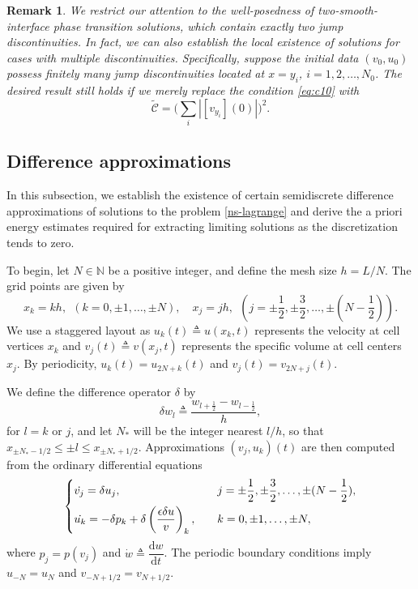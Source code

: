 \documentclass[a4paper,oneside,11pt]{article}
\numberwithin{equation}{section}
\newtheorem{remark}{Remark}[section]
\begin{document}
\begin{remark}
We restrict our attention to the well-posedness of two-smooth-interface phase transition solutions, which contain exactly two jump discontinuities. In fact, we can also establish the local existence of solutions for cases with multiple discontinuities. Specifically, suppose the initial data $(v_0, u_0)$ possess finitely many jump discontinuities located at $x=y_i$, $i=1,2,\dots,N_0$. The desired result still holds if we merely replace the condition \eqref{eq:c10} with 
\begin{equation*}
\widetilde{\mathscr{C}}=\big(\mathop{\sum }\limits_{i}|[v_{y_i}](0)|\big)^{2}.
\end{equation*}
\end{remark}


\subsection{Difference approximations}
\indent\qquad
In this subsection, we establish the existence of certain semidiscrete difference approximations of solutions to the problem \eqref{ns-lagrange} and derive the a priori energy estimates required for extracting limiting solutions as the discretization tends to zero.

To begin, let \(N\in\mathbb{N}\) be a positive integer, and define the mesh size \(h=L/N\). The grid points are given by
\[
x_k=kh,~~ (k=0,\pm 1,\dots,\pm N), \quad x_j=jh,~~ (j=\pm\frac12,\pm\frac32,\dots, \pm(N-\frac12)).
\]
We use a staggered layout as \(u_k(t)\triangleq u(x_k,t)\) represents the velocity at cell vertices \(x_k\) and \(v_j(t)\triangleq v(x_j,t)\) represents the specific volume at cell centers \(x_{j}\).
By periodicity, \(u_k(t)=u_{2N+k}(t)\) and \(v_{j}(t)=v_{2N+j}(t)\). 

We define the difference operator \(\delta\) by
\[\delta w_l \triangleq \frac{w_{l+\frac12}-w_{l-\frac12}}h,\]
for \(l=k\) or \(j\), and let $N_*$ will be the integer nearest $l/h$, so that $x_{\pm N_* -1/2}\leq {\pm l}\leq x_{\pm N_* +1/2}$.
Approximations $(v_j,u_k)(t)$ are then computed from the ordinary differential equations
\begin{equation}\label{eq:scheme}\left\{
\begin{aligned} 
\displaystyle  &\dot{v_j}=\delta u_j,&&\quad j=\pm \frac12,\pm \frac32,\dots,\pm(N-\frac12),\\
&\dot{u_k}=-\delta p_k+\delta\left(\frac{\epsilon \delta u}{v} \right)_k, &&\quad k=0,\pm 1,\dots,\pm N,
\end{aligned}\right.
\end{equation}
where $p_j=p(v_j)$ and $\dot{w}\triangleq \dfrac{\mathrm{d}w}{\mathrm{d}t}$.  The periodic boundary conditions imply \(u_{-N}=u_N\) and \(v_{-N+1/2}=v_{N+1/2}\). 
\end{document}
